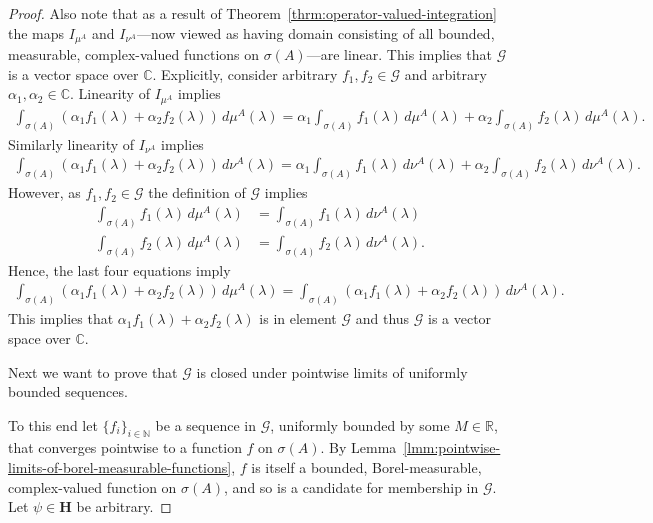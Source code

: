 \begin{proof}
Also note that as a result of Theorem~\ref{thrm:operator-valued-integration} the maps $I_{\mu^A}$ and $I_{\nu^A}$---now viewed as having domain consisting of all bounded, measurable, complex-valued functions on $\sigma(A)$---are linear. This implies that $\mathcal{G}$ is a vector space over $\mathbb{C}$. Explicitly, consider arbitrary $f_1,f_2 \in \mathcal{G}$ and arbitrary $\alpha_1, \alpha_2 \in \mathbb{C}$. Linearity of $I_{\mu^A}$ implies
\begin{align}
    \int_{\sigma(A)} \left( \alpha_1 f_1(\lambda) + \alpha_2 f_2(\lambda) \right) \, d\mu^A(\lambda) =  
    \alpha_1 \int_{\sigma(A)} f_1(\lambda) \, d\mu^A(\lambda) + \alpha_2 \int_{\sigma(A)} f_2(\lambda) \, d\mu^A(\lambda).
\end{align}
Similarly linearity of $I_{\nu^A}$ implies
\begin{align}
    \int_{\sigma(A)} \left( \alpha_1 f_1(\lambda) + \alpha_2 f_2(\lambda) \right) \, d\nu^A(\lambda) =  
    \alpha_1 \int_{\sigma(A)} f_1(\lambda) \, d\nu^A(\lambda) + \alpha_2 \int_{\sigma(A)} f_2(\lambda) \, d\nu^A(\lambda).
\end{align}
However, as $f_1,f_2 \in \mathcal{G}$ the definition of $\mathcal{G}$ implies
\begin{align}
    \int_{\sigma(A)} f_1(\lambda) \, d\mu^A(\lambda) &= \int_{\sigma(A)} f_1(\lambda) \, d\nu^A(\lambda) \\
    \int_{\sigma(A)} f_2(\lambda) \, d\mu^A(\lambda) &= \int_{\sigma(A)} f_2(\lambda) \, d\nu^A(\lambda). 
\end{align}
Hence, the last four equations imply
\begin{align}
    \int_{\sigma(A)} \left( \alpha_1 f_1(\lambda) + \alpha_2 f_2(\lambda) \right) \, d\mu^A(\lambda) = 
    \int_{\sigma(A)} \left( \alpha_1 f_1(\lambda) + \alpha_2 f_2(\lambda) \right) \, d\nu^A(\lambda).
\end{align}
This implies that $\alpha_1 f_1(\lambda) + \alpha_2 f_2(\lambda)$ is in element $\mathcal{G}$ and thus $\mathcal{G}$ is a vector space over $\mathbb{C}$.

Next we want to prove that $\mathcal{G}$ is closed under pointwise limits of uniformly bounded sequences.

To this end let $\{ f_i \}_{i \in \mathbb{N}}$ be a sequence in $\mathcal{G}$, uniformly bounded by some $M \in \mathbb{R}$, that converges pointwise to a function $f$ on $\sigma(A)$. By Lemma~\ref{lmm:pointwise-limits-of-borel-measurable-functions}, $f$ is itself a bounded, Borel-measurable, complex-valued function on $\sigma(A)$, and so is a candidate for membership in $\mathcal{G}$. Let $\psi \in \mathbf{H}$ be arbitrary.


\end{proof}
